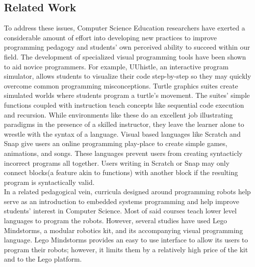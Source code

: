 \documentclass[12pt]{article}
\begin{document}
\subsection {Related Work} 
To address these issues, Computer Science Education researchers have exerted a considerable amount of effort into developing new practices to improve programming pedagogy and students' own perceived ability to succeed within our field. The development of specialized visual programming tools have been shown to aid novice programmers\cite{UUhistle}\cite{greenfoot}\cite{CS1forScientists}. For example, UUhistle, an interactive program simulator, allows students to visualize their code step-by-step so they may quickly overcome common programming misconceptions.\cite{UUhistle} Turtle graphics suites create simulated worlds where students program a turtle's movement. The suites' simple functions coupled with instruction teach concepts like sequential code execution and recursion.\cite{greenfoot}\cite{CS1forScientists} While environments like these do an excellent job illustrating paradigms in the presence of a skilled instructor, they leave the learner alone to wrestle with the syntax of a language. Visual based languages like Scratch and Snap give users an online programming play-place to create simple games, animations, and songs. These languages prevent users from creating syntacticly incorrect programs all together. Users writing in Scratch or Snap may only connect blocks(a feature akin to functions) with another block if the resulting program is syntactically valid.\cite{Scratch}\\[7pt]
 In a related pedagogical vein, curricula designed around programming robots help serve as an introduction to embedded systems programming and help improve students' interest in Computer Science.\cite{PersonalizingCS1}\cite{RobotMotivation}\cite {elementaryRobots}\cite{cRobots}\cite{primarySchool} Most of said courses teach lower level languages to program the robots. However, several studies have used Lego Mindstorms, a modular robotics kit, and its accompanying visual programming language.\cite{legomindstorms}\cite{legomindstorms2} Lego Mindstorms provides an easy to use interface to allow its users to program their robots; however, it limits them by a relatively high price of the kit and to the Lego platform.
\end{document}
